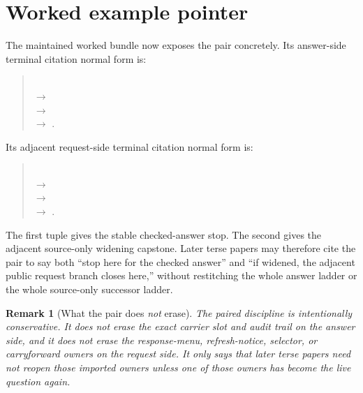\documentclass[11pt]{article}
\newtheorem{remark}{Remark}
\begin{document}
\section{Worked example pointer}
The maintained worked bundle now exposes the pair concretely.
Its answer-side terminal citation normal form is:
\begin{quote}\small
{}\\
$\to$ \\
$\to$ \\
$\to$ .
\end{quote}
Its adjacent request-side terminal citation normal form is:
\begin{quote}\small
{}\\
$\to$ \\
$\to$ \\
$\to$ .
\end{quote}
The first tuple gives the stable checked-answer stop.
The second gives the adjacent source-only widening capstone.
Later terse papers may therefore cite the pair to say both ``stop here for the checked answer'' and ``if widened, the adjacent public request branch closes here,'' without restitching the whole answer ladder or the whole source-only successor ladder.

\begin{remark}[What the pair does \emph{not} erase]
The paired discipline is intentionally conservative.
It does not erase the exact carrier slot and audit trail on the answer side, and it does not erase the response-menu, refresh-notice, selector, or carryforward owners on the request side.
It only says that later terse papers need not reopen those imported owners unless one of those owners has become the live question again.
\end{remark}
\end{document}
